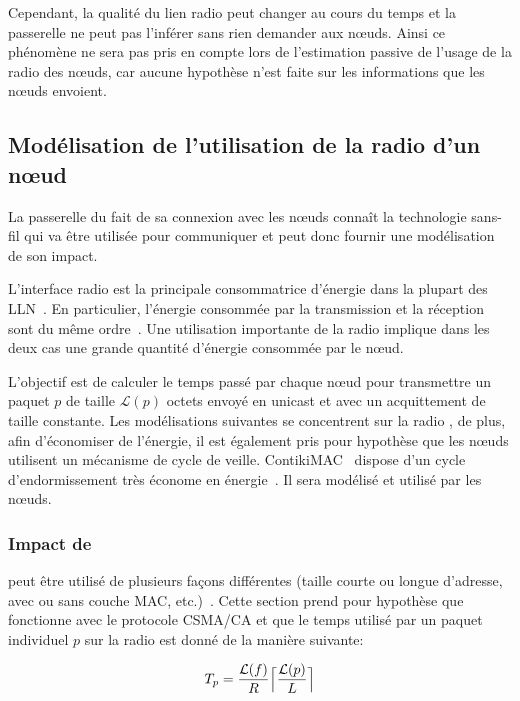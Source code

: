 Cependant, la qualité du lien radio peut changer au cours du temps et la passerelle ne peut pas l'inférer sans rien demander aux nœuds.
Ainsi ce phénomène ne sera pas pris en compte lors de l'estimation passive de l'usage de la radio des nœuds, car aucune hypothèse n'est faite sur les informations que les nœuds envoient.

\subsection{Modélisation de l'utilisation de la radio d'un nœud}
\label{supervision:models}

La passerelle du fait de sa connexion avec les nœuds connaît la technologie sans-fil qui va être utilisée pour communiquer et peut donc fournir une modélisation de son impact.

L'interface radio est la principale consommatrice d'énergie dans la plupart des \ac{LLN}~\cite{antolin2013analysis}.
En particulier, l'énergie consommée par la transmission et la réception sont du même ordre~\cite{duarte2002analysis}.
Une utilisation importante de la radio implique dans les deux cas une grande quantité d'énergie consommée par le nœud.

L'objectif est de calculer le temps passé par chaque nœud pour transmettre un paquet $p$ de taille $\mathcal{L}(p)$ octets envoyé en unicast et avec un acquittement de taille constante.
Les modélisations suivantes se concentrent sur la radio \ieee{}, de plus, afin d'économiser de l'énergie, il est également pris pour hypothèse que les nœuds utilisent un mécanisme de cycle de veille.
ContikiMAC~\cite{dunkels11contikimac} dispose d'un cycle d'endormissement très économe en énergie~\cite{michel2014analyse}.
Il sera modélisé et utilisé par les nœuds.

\subsubsection{Impact de \ieee{}}

\ieee{} peut être utilisé de plusieurs façons différentes (taille courte ou longue d'adresse, avec ou sans couche \ac{MAC}, etc.)~\cite{baronti2007wireless}.
Cette section prend pour hypothèse que \ieee{} fonctionne avec le protocole \ac{CSMA/CA} et que le temps utilisé par un paquet individuel $p$ sur la radio est donné de la manière suivante:

\DeclarePairedDelimiter{\ceil}{\lceil}{\rceil}

\[T_p = \frac{\mathcal{L}(f)}{R} \ceil[\Big]{\frac{\mathcal{L}(p)}{L}}\]

